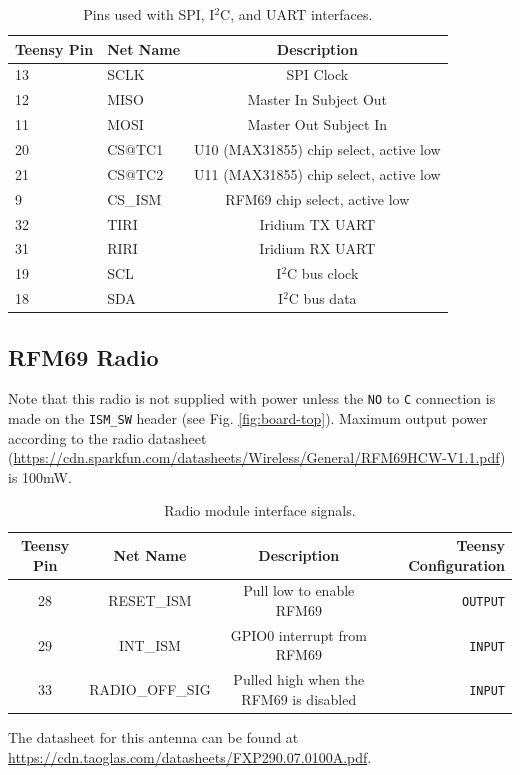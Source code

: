 \documentclass{article}
\begin{document}
\begin{table}[H]
    \centering
    \begin{tabular}{l|l|c}
   Teensy Pin & Net Name &  Description \\
    \hline \hline
    
        \hline
    13 & SCLK     &  SPI Clock \\
    12 & MISO     &  Master In Subject Out \\
    11 & MOSI     &  Master Out Subject In \\
    20 & CS@TC1 & U10 (MAX31855) chip select, active low \\
    21 & CS@TC2 & U11 (MAX31855) chip select, active low  \\
    9 & CS\_ISM     & RFM69 chip select, active low  \\
    \hline
    32 & TIRI     & Iridium TX UART \\
    31 & RIRI      & Iridium RX UART \\
    \hline
    19 & SCL & I$^2$C bus clock \\
    18 & SDA & I$^2$C bus data
    \end{tabular}
    \caption{Pins used with SPI, I$^2$C, and UART interfaces.}
    \label{tab:pins_serial}
\end{table}

\subsection{RFM69 Radio}
Note that this radio is not supplied with power unless the \texttt{NO} to \texttt{C} connection is made on the \texttt{ISM\_SW} header (see Fig. \ref{fig:board-top}).  Maximum output power according to the radio datasheet (\url{https://cdn.sparkfun.com/datasheets/Wireless/General/RFM69HCW-V1.1.pdf}) is 100mW.
\begin{table}[H]
    \centering
    \begin{tabular}{c|c|c|r}
    Teensy Pin & Net Name  & Description   & Teensy Configuration \\
    \hline 
    28 & RESET\_ISM  &  Pull low to enable RFM69   & \texttt{OUTPUT} \\
    29 & INT\_ISM    &  GPIO0 interrupt from RFM69 & \texttt{INPUT} \\
    33 & RADIO\_OFF\_SIG & Pulled high when the RFM69 is disabled & \texttt{INPUT} \\
    \end{tabular}
    \caption{Radio module interface signals.}
    \label{tab:pins_radio}
\end{table}
The datasheet for this antenna can be found at  \url{https://cdn.taoglas.com/datasheets/FXP290.07.0100A.pdf}. 
\end{document}
